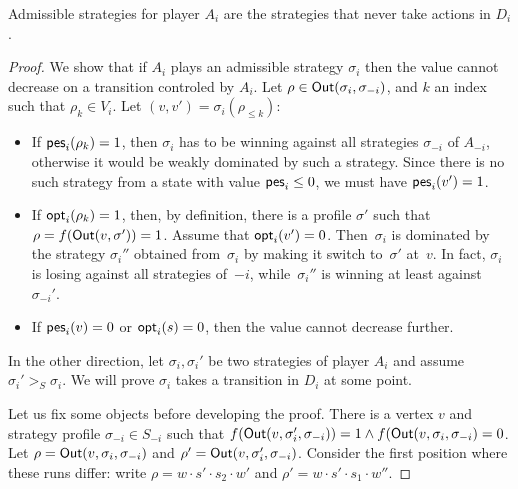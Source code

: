 \begin{theorem}
  \label{14-thm:adm}
Admissible
strategies for player \(A_i\) are the strategies that never take actions
in \(D_i\).
\end{theorem}
\begin{proof} We show that if \(A_i\) plays an admissible strategy
\(\sigma_i\) then the value cannot decrease on a transition controled by
\(A_i\). Let \(\rho \in \textsf{Out}(\sigma_i,\sigma_{-i})\), and \(k\) an index
such that \(\rho_k \in V_i\). Let \((v, v') = \sigma_i(\rho_{\le k})\):

\begin{itemize}

\item
  If \(\textsf{pes}_i(\rho_k)=1\), then \(\sigma_i\) has to be winning against
  all strategies \(\sigma_{-i}\) of \(A_{-i}\), otherwise it would be
  weakly dominated by such a strategy. Since there is no such strategy
  from a state with value \(\textsf{pes}_i \leq 0\), we must have \(\textsf{pes}_i(v')=1\).
\item
  If \(\textsf{opt}_i(\rho_k) = 1\), then, by definition, there is a profile \(\sigma'\) such that
  \(\rho = f(\textsf{Out}(v, \sigma')) = 1\).
  Assume that $\textsf{opt}_i(v')=0$. Then~$\sigma_i$ is dominated by the strategy
  $\sigma_i''$ obtained from~$\sigma_i$ by making it switch to~$\sigma'$ at~$v$.
  In fact, $\sigma_i$ is losing against all strategies of~$-i$, while~$\sigma_i''$
  is winning at least against~$\sigma_{-i}'$.
\item
  If $\textsf{pes}_i(v)=0$ or $\textsf{opt}_i(s) = 0$, then the value cannot decrease further.
\end{itemize}

In the other direction, let \(\sigma_i,\sigma_i'\) be two strategies of
player \(A_i\) and assume \(\sigma_i' >_S \sigma_i\). We will prove
\(\sigma_i\) takes a transition in \(D_i\) at some point.

Let us fix some objects before developing the proof. There is a vertex
\(v\) and strategy profile \(\sigma_{-i} \in S_{-i}\) such that
\(f(\textsf{Out}(v,\sigma_i',\sigma_{-i}))=1 \wedge f(\textsf{Out}(v,\sigma_i,\sigma_{-i})=0\).
Let \(\rho = \textsf{Out}(v,\sigma_i,\sigma_{-i})\) and
\(\rho' = \textsf{Out}(v,\sigma_i',\sigma_{-i})\). Consider the first position
where these runs differ: write \(\rho = w \cdot s' \cdot s_2 \cdot w'\)
and \(\rho' = w \cdot s' \cdot s_1 \cdot w''\).


\end{proof}
